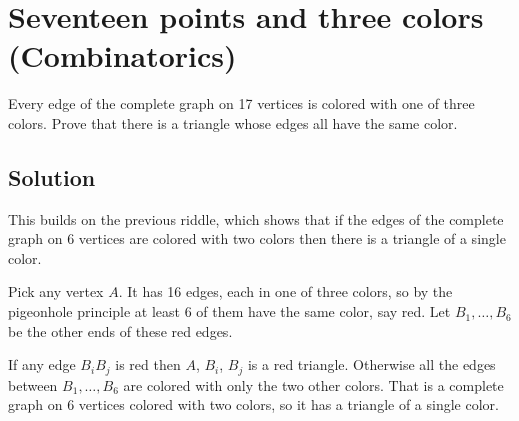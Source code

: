 \section {Seventeen points and three colors (Combinatorics)}

Every edge of the complete graph on 17 vertices is colored with one of three colors.
Prove that there is a triangle whose edges all have the same color.

\subsection{Solution}

This builds on the previous riddle, which shows that if the edges of the complete graph on 6 vertices are colored with
two colors then there is a triangle of a single color.

Pick any vertex $A$. It has 16 edges, each in one of three colors, so by the pigeonhole principle at least $6$ of them
have the same color, say red. Let $B_1, \ldots, B_6$ be the other ends of these red edges.

If any edge $B_iB_j$ is red then $A$, $B_i$, $B_j$ is a red triangle.
Otherwise all the edges between $B_1, \ldots, B_6$ are colored with only the two other colors.
That is a complete graph on 6 vertices colored with two colors, so it has a triangle of a single color.

